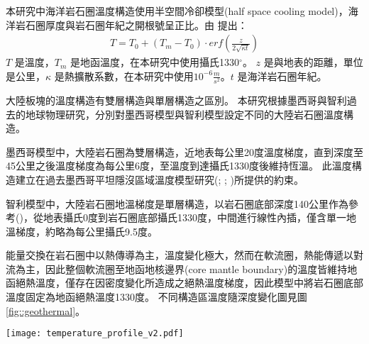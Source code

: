 

本研究中海洋岩石圈溫度構造使用半空間冷卻模型(half space cooling model)，海洋岩石圈厚度與岩石圈年紀之開根號呈正比。由 \citealp{davis1974}提出：
\begin{align}
T=T_0+(T_m-T_0)\cdot erf(\frac{z}{2\sqrt{\kappa t}}) \label{eq:Half Space Model}
\end{align}
$T$ 是溫度，$T_m$ 是地函溫度，在本研究中使用攝氏1330$^{\circ}$。
$z$ 是與地表的距離，單位是公里，$\kappa$ 是熱擴散系數，在本研究中使用$10^{-6} \frac{m}{s^2}$。$t$ 是海洋岩石圈年紀。

大陸板塊的溫度構造有雙層構造與單層構造之區別。
本研究根據墨西哥與智利過去的地球物理研究，分別對墨西哥模型與智利模型設定不同的大陸岩石圈溫度構造。

墨西哥模型中，大陸岩石圈為雙層構造，近地表每公里20度溫度梯度，直到深度至45公里之後溫度梯度為每公里6度，至溫度到達攝氏1330度後維持恆溫。
此溫度構造建立在過去墨西哥平坦隱沒區域溫度模型研究(\citealp{Manea2005}; \citealp{Manea2011Thermal}; \citealp{Manea2011Curie})所提供的約束。

智利模型中，大陸岩石圈地溫梯度是單層構造，以岩石圈底部深度140公里作為參考(\citealp{perez2008})，從地表攝氏0度到岩石圈底部攝氏1330度，中間進行線性內插，僅含單一地溫梯度，約略為每公里攝氏9.5度。

能量交換在岩石圈中以熱傳導為主，溫度變化極大，然而在軟流圈，熱能傳遞以對流為主，因此整個軟流圈至地函地核邊界(core mantle boundary)的溫度皆維持地函絕熱溫度，僅存在因密度變化所造成之絕熱溫度梯度，因此模型中將岩石圈底部溫度固定為地函絕熱溫度1330度。
不同構造區溫度隨深度變化圖見圖\ref{fig::geothermal}。
\begin{figure*}[ht!]
    \centering
    \texttt{[image: temperature\_profile\_v2.pdf]}
    \caption[本研究使用之模型地下溫度剖面圖]{本研究使用之模型地下溫度剖面圖，左圖為智利模型，右圖為墨西哥模型。藍色實線為海洋岩石圈地溫梯度，由式\ref{eq:Half Space Model}與海洋岩石圈年紀決定。咖啡色實線為大陸岩石圈地溫梯度，智利模型大陸岩石圈為單層構造，墨西哥模型大陸岩石圈為雙層構造。圖中並沒有考量絕熱地溫梯度。}
    \label{fig::geothermal}
\end{figure*}


